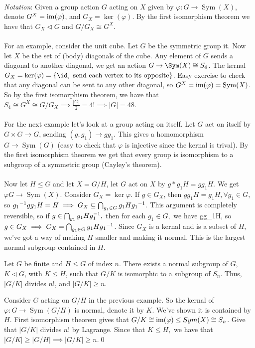 \documentclass{article}
\newcommand{\nrm}{\triangleleft}
\DeclareMathOperator{\sym}{Sym}
\begin{document}
\begin{itemize}
\\  \textit{Notation}: Given a group action $ G $ acting on $ X $ given by $ \varphi:G\to\sym(X) $, denote $ G^X=\operatorname{im}(\varphi) $, and $ G_X=\ker(\varphi) $. By the first isomorphism theorem we have that $ G_X\nrm G $ and $ G/G_X\cong G^X $.\\\\
For an example, consider the unit cube. Let $ G $ be the symmetric group it. Now let $ X $ be the set of (body) diagonals of the cube. Any element of $ G $ sends a diagonal to another diagonal, we get an action $ G\to\Sym(X)\cong S_4 $. The kernal $ G_X=\ker(\varphi)=\{\id, \text{ send each vertex to its opposite} \} $. Easy exercise to check that any diagonal can be sent to any other diagonal, so $ G^X=\ima (\varphi)=\sym(X) $. So by the first isomorphism theorem, we have that $ S_4\cong G^X\cong G/G_X\implies \frac{|G|}2 = 4!\implies |G|=48 $.\\\\
For the next example let's look at a group acting on itself. Let $ G $ act on itself by $ G\times G\to G $, sending $ (g,g_1)\to gg_1 $. This gives a homomorphism $ G\to \sym(G) $ (easy to check that $ \varphi $ is injective since the kernal is trival). By the first isomorphism theorem we get that every group is isomorphism to a subgroup of a symmetric group (Cayley's theorem).\\\\
Now let $ H\le G $ and let $ X=G/H $, let $ G $ act on $ X $ by $ g*g_1H=gg_1 H $. We get $ \varphi G\to\sym(X) $. Consider $ G_X=\ker \varphi $. If $ g\in G_X $, then $ gg_1H=g_1H, \forall g_1\in G $, so $ {g_1}^{-1}gg_1 H=H\implies G_X\subseteq \bigcap_{g_1\in G} g_1H{g_1}^{-1}.$ This argument is completely reversible, so if $ g\in\bigcap_{g_1}g_1H{g}^{-1}_1, $ then for each $ g_1\in G, $ we have gg_1\in H, so $ g\in G_X\implies G_X=\bigcap_{g_1\in G}g_1H{g_1}^{-1} $. Since $ G_X $ is a kernal and is a subset of $ H $, we've got a way of making $ H $ smaller and making it normal. This is the largest normal subgroup contained in $ H $.
\begin{theorem}
	  Let $ G $ be finite and $ H\le G $ of index $ n $. There exists a normal subgroup of $ G $, $ K\nrm G $, with $ K\le H $, such that $ G/K $ is isomorphic to a subgroup of $ S_n $. Thus, $ |G/K| $ divides $ n! $, and $ |G/K|\ge n$.
\end{theorem}
\pf Consider $ G $ acting on $ G/H $ in the previous example. So the kernal of $ \varphi:G\to\sym(G/H) $ is normal, denote it by $ K $. We've shown it is contained by $ H $. First isomorphism theorem gives that $ G/K\cong \operatorname{im}(\varphi)\le Sym(X)\cong S_n $. Give that $ |G/K| $ divides $ n! $ by Lagrange. Since that $ K\le H, $ we have that $ |G/K|\ge |G/H|\implies |G/K|\ge n $.\qed

\end{itemize}
\end{document}
